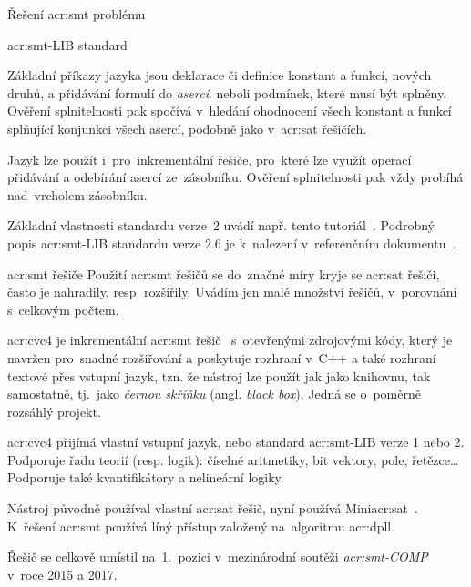 \documentclass[thesis=M,czech]{FITthesis}[2012/06/26]
\newcommand{\acrlabel}[1]{acr:#1}
\newcommand{\acr}[1]{\acrshort{\acrlabel{#1}}}
\newcommand{\hl}[1]{\textit{#1}}
\newcommand{\name}[1]{\hl{#1}}
\newcommand{\cit}[1]{\cite{#1}}
\begin{document}
\begin{section}{Řešení \acr{smt} problému}
\begin{subsection}{\acr{smt}-LIB standard}
\bigskip

Základní příkazy jazyka jsou deklarace či definice konstant a funkcí,
nových druhů, a přidávání formulí do \name{asercí}.
neboli podmínek, které musí být splněny.
Ověření splnitelnosti pak spočívá v~hledání ohodnocení
všech konstant a funkcí splňující konjunkci všech asercí,
podobně jako v~\acr{sat} řešičích.

Jazyk lze použít i~pro~inkrementální řešiče,
pro~které lze využít operací přidávání a odebírání
asercí ze~zásobníku.
Ověření splnitelnosti pak vždy probíhá
nad~vrcholem zásobníku.

Základní vlastnosti standardu verze~2
uvádí např. tento tutoriál~\cit{smtlib-tutorial-art}.
Podrobný popis \acr{smt}-LIB standardu verze 2.6
je k~nalezení v~referenčním dokumentu~\cit{smtlib-reference-art}.
\end{subsection} %


\begin{subsection}{\acr{smt} řešiče}\label{ss:search:smt:solver}
Použití \acr{smt} řešičů se do~značné míry kryje se \acr{sat} řešiči,
často je nahradily, resp. rozšířily.
Uvádím jen malé množství řešičů,
v~porovnání s~celkovým počtem.


\begin{paragraph}{\acr{cvc}4}\label{p:search:smt:solver:cvc4}
je inkrementální \acr{smt} řešič~\cit{cvc4}\cit{cvc4-art}
s~otevřenými zdrojovými kódy,
který je navržen pro~snadné rozšiřování
a poskytuje rozhraní v~C++
a také rozhraní textové přes vstupní jazyk,
tzn. že nástroj lze použít jak jako knihovnu,
tak samostatně,
tj.~jako \name{černou skříňku} (angl. \name{black box}).
Jedná se o~poměrně rozsáhlý projekt.

\acr{cvc}4 přijímá vlastní vstupní jazyk,
nebo standard \acr{smt}-LIB verze 1 nebo 2.
Podporuje řadu teorií (resp. logik):
číselné aritmetiky, bit vektory, pole, řetězce\dots
Podporuje také kvantifikátory
a nelineární logiky.

Nástroj původně používal vlastní \acr{sat} řešič,
nyní používá Mini\acr{sat}~\cit{cvc4-art}.
K~řešení \acr{smt} používá líný přístup
založený na~algoritmu \acr{dpll}.

Řešič se celkově umístil na~1.~pozici
v~mezinárodní soutěži
\name{\acr{smt}-COMP}~\cit{smtcomp}\cit{smtcomp-art}
v~roce 2015 a 2017.
\end{paragraph} %


\end{subsection}
\end{section}
\end{document}
